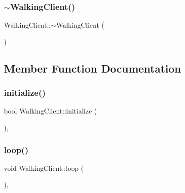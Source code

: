 \subsubsection{\texorpdfstring{$\sim$\+Walking\+Client()}{~WalkingClient()}}
{\footnotesize\ttfamily Walking\+Client\+::$\sim$\+Walking\+Client (\begin{DoxyParamCaption}{ }\end{DoxyParamCaption})\hspace{0.3cm}{\ttfamily [virtual]}}



\subsection{Member Function Documentation}
\hypertarget{classWalkingClient_aba6a03fe29a4e947bc6bc0c09a713b2a}{}\label{classWalkingClient_aba6a03fe29a4e947bc6bc0c09a713b2a} 
\subsubsection{\texorpdfstring{initialize()}{initialize()}}
{\footnotesize\ttfamily bool Walking\+Client\+::initialize (\begin{DoxyParamCaption}{ }\end{DoxyParamCaption})\hspace{0.3cm}{\ttfamily [protected]}, {\ttfamily [virtual]}}

\hypertarget{classWalkingClient_afd997bb00534c57fe1b0d5f37f207386}{}\label{classWalkingClient_afd997bb00534c57fe1b0d5f37f207386} 
\subsubsection{\texorpdfstring{loop()}{loop()}}
{\footnotesize\ttfamily void Walking\+Client\+::loop (\begin{DoxyParamCaption}{ }\end{DoxyParamCaption})\hspace{0.3cm}{\ttfamily [protected]}, {\ttfamily [virtual]}}

\hypertarget{classWalkingClient_a3b36da9d7649865a13c9318dd73ebc7e}{}\label{classWalkingClient_a3b36da9d7649865a13c9318dd73ebc7e} 

